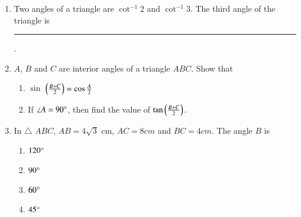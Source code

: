 \begin{enumerate}
\hfill{}\item Two angles of a triangle are  $\cot^{-1}2$ and $\cot^{-1}3$. The third angle of the
triangle is \rule{1cm}{0.1pt}.
%
\hfill{}
%
\item $A$, $B$ and $C$ are interior angles of a triangle $ABC$. Show that
\begin{enumerate}
\item  $\sin$ $ \left({\frac {B+C}{2}}\right) = \cos {\frac {A}{2}}$
\item  If $\angle A = 90 \degree$, then find the value of $\tan \left({\frac{B+C}{2}}\right)$.
\end{enumerate} 
%
\hfill{}	\item In $\triangle$ $ABC$, $AB = {4\sqrt{3}}$ cm, $AC = 8 cm$ and $BC = 4 cm$. The angle $B$ is
	\begin{multicols}{4}
				\begin{enumerate}
\item $120\degree$
\item $90\degree$
\item $60\degree$
\item $45\degree$
				\end{enumerate}
\end{multicols}
	\hfill{}
%
\end{enumerate}
